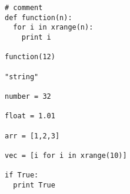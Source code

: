 \documentclass{article}
\begin{document}
\begin{lstlisting}[caption=キャプション,label=ラベル]
# comment
def function(n):
  for i in xrange(n):
    print i

function(12)

"string"

number = 32

float = 1.01

arr = [1,2,3]

vec = [i for i in xrange(10)]

if True:
  print True

\end{lstlisting}
\end{document}
